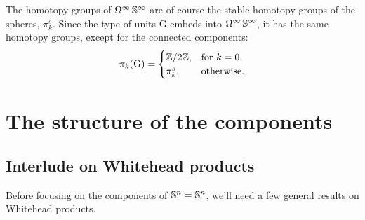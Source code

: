 \documentclass[english,a4paper]{lmcs}
\begin{document}
The homotopy groups of $\mathop{\Omega^{\infty}}{\mathbb S^{\infty}}$ are of course
the stable homotopy groups of the spheres, $\pi^s_k$.
Since the type of units $\mathrm{G}$ embeds into $\mathop{\Omega^{\infty}}{\mathbb S^{\infty}}$,
it has the same homotopy groups, except for the connected components:
\[
  \pi_k(\mathrm{G}) =
  \begin{cases}
    \mathbb{Z}/2\mathbb{Z}, &\text{for $k=0$,} \\
    \pi^s_k, &\text{otherwise.}
  \end{cases}
\]

\section{The structure of the components}
\label{sec:structure-components}

\subsection{Interlude on Whitehead products}
\label{sec:whitehead-interlude}

Before focusing on the components of ${\mathbb S^{n}} = {\mathbb S^{n}}$,
we'll need a few general results on Whitehead products.
\end{document}
